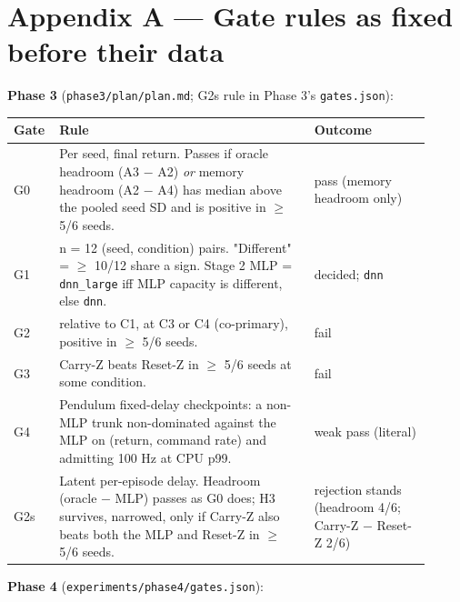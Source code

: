 \documentclass[11pt]{article}
\begin{document}
\medskip



\section*{Appendix A --- Gate rules as fixed before their data}



\textbf{Phase 3} (\texttt{phase3/\allowbreak{}plan/\allowbreak{}plan.\allowbreak{}md}; G2s rule in Phase 3's \texttt{gates.json}):



\begin{center}\small\begin{tabular}{>{\raggedright\arraybackslash}p{0.063\linewidth}>{\raggedright\arraybackslash}p{0.580\linewidth}>{\raggedright\arraybackslash}p{0.263\linewidth}}
\toprule
Gate & Rule & Outcome \\
\midrule
G0 & Per seed, final return. Passes if oracle headroom (A3 $-$ A2) \emph{or} memory headroom (A2 $-$ A4) has median above the pooled seed SD and is positive in $\geq$ 5/6 seeds. & pass (memory headroom only) \\
G1 & n = 12 (seed, condition) pairs. "Different" = $\geq$ 10/12 share a sign. Stage 2 MLP = \texttt{dnn\_large} iff MLP capacity is different, else \texttt{dnn}. & decided; \texttt{dnn} \\
G2 & [Carry-Z $-$ MLP] relative to C1, at C3 or C4 (co-primary), positive in $\geq$ 5/6 seeds. & fail \\
G3 & Carry-Z beats Reset-Z in $\geq$ 5/6 seeds at some condition. & fail \\
G4 & Pendulum fixed-delay checkpoints: a non-MLP trunk non-dominated against the MLP on (return, command rate) and admitting 100 Hz at CPU p99. & weak pass (literal) \\
G2s & Latent per-episode delay. Headroom (oracle $-$ MLP) passes as G0 does; H3 survives, narrowed, only if Carry-Z also beats both the MLP and Reset-Z in $\geq$ 5/6 seeds. & rejection stands (headroom 4/6; Carry-Z $-$ Reset-Z 2/6) \\
\bottomrule
\end{tabular}\end{center}



\textbf{Phase 4} (\texttt{experiments/\allowbreak{}phase4/\allowbreak{}gates.\allowbreak{}json}):
\end{document}
